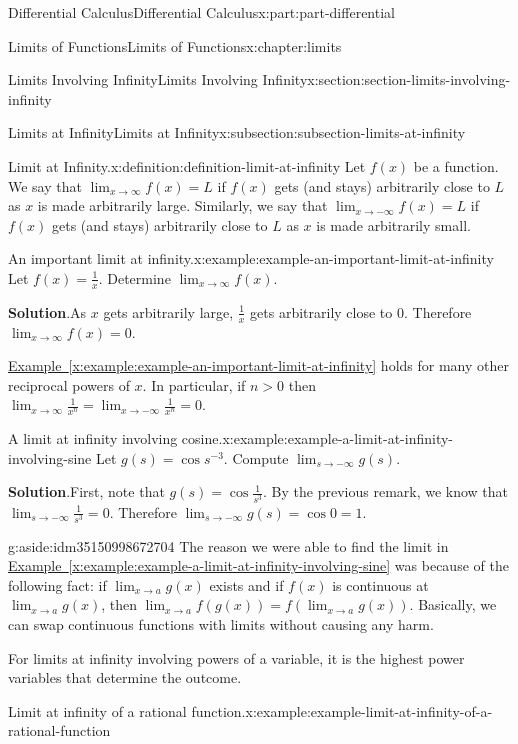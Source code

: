 \documentclass[twoside,10pt,]{tufte-book}
\newcommand{\blocktitlefont}{\relax}
\newcommand{\xreffont}{\relax}
\numberwithin{equation}{part}
\begin{document}
\begin{partptx}{Differential Calculus}{}{Differential Calculus}{}{}{x:part:part-differential}
\begin{chapterptx}{Limits of Functions}{}{Limits of Functions}{}{}{x:chapter:limits}
\begin{sectionptx}{Limits Involving Infinity}{}{Limits Involving Infinity}{}{}{x:section:section-limits-involving-infinity}
\begin{subsectionptx}{Limits at Infinity}{}{Limits at Infinity}{}{}{x:subsection:subsection-limits-at-infinity}
\begin{definition}{Limit at Infinity.}{x:definition:definition-limit-at-infinity}
Let \(f(x)\) be a function. We say that \(\lim_{x\to\infty}f(x) = L\) if \(f(x)\) gets (and stays) arbitrarily close to \(L\) as \(x\) is made arbitrarily large. Similarly, we say that \(\lim_{x\to-\infty}f(x) = L\) if \(f(x)\) gets (and stays) arbitrarily close to \(L\) as \(x\) is made arbitrarily small.%
\end{definition}
\begin{example}{An important limit at infinity.}{x:example:example-an-important-limit-at-infinity}%
Let \(f(x) = \frac{1}{x}\). Determine \(\lim_{x\to\infty}f(x)\).%
\par\smallskip%
\noindent\textbf{\blocktitlefont Solution}.\hypertarget{g:solution:idm35150998679872}{}\quad{}As \(x\) gets arbitrarily large, \(\frac{1}{x}\) gets arbitrarily close to \(0\). Therefore \(\lim_{x\to\infty}f(x) = 0\).%
\end{example}
\hyperref[x:example:example-an-important-limit-at-infinity]{Example~{\xreffont\ref{x:example:example-an-important-limit-at-infinity}}} holds for many other reciprocal powers of \(x\). In particular, if \(n>0\) then \(\lim_{x\to\infty}\frac{1}{x^{n}} = \lim_{x\to-\infty}\frac{1}{x^{n}} = 0\).%
\begin{example}{A limit at infinity involving cosine.}{x:example:example-a-limit-at-infinity-involving-sine}%
Let \(g(s) = \cos s^{-3}\). Compute \(\lim_{s\to-\infty}g(s)\).%
\par\smallskip%
\noindent\textbf{\blocktitlefont Solution}.\hypertarget{g:solution:idm35150998674240}{}\quad{}First, note that \(g(s) = \cos\frac{1}{s^{3}}\). By the previous remark, we know that \(\lim_{s\to-\infty}\frac{1}{s^{3}} = 0\). Therefore \(\lim_{s\to-\infty}g(s) = \cos0 = 1\).%
\end{example}
\begin{aside}{}{g:aside:idm35150998672704}%
The reason we were able to find the limit in \hyperref[x:example:example-a-limit-at-infinity-involving-sine]{Example~{\xreffont\ref{x:example:example-a-limit-at-infinity-involving-sine}}} was because of the following fact: if \(\lim_{x\to a}g(x)\) exists and if \(f(x)\) is continuous at \(\lim_{x\to a}g(x)\), then \(\lim_{x\to a}f(g(x)) = f(\lim_{x\to a}g(x))\). Basically, we can swap continuous functions with limits without causing any harm.%
\end{aside}
For limits at infinity involving powers of a variable, it is the highest power variables that determine the outcome.%
\begin{example}{Limit at infinity of a rational function.}{x:example:example-limit-at-infinity-of-a-rational-function}%

\end{example}
\end{subsectionptx}
\end{sectionptx}
\end{chapterptx}
\end{partptx}
\end{document}
